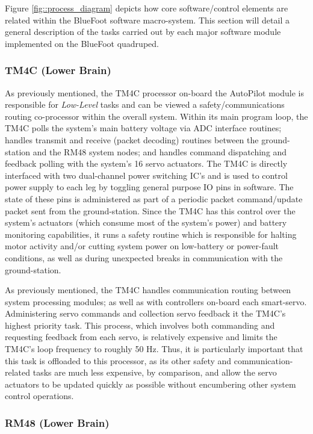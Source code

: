 		Figure \ref{fig::process_diagram} depicts how core software/control elements are related within the BlueFoot software macro-system. This section will detail a general description of the tasks carried out by each major software module implemented on the BlueFoot quadruped.

			\subsubsection{TM4C (Lower Brain)}

			As previously mentioned, the TM4C processor on-board the AutoPilot module is responsible for \emph{Low-Level} tasks and can be viewed a safety/communications routing co-processor within the overall system. Within its main program loop, the TM4C polls the system's main battery voltage via ADC interface routines; handles transmit and receive (packet decoding) routines between the ground-station and the RM48 system nodes; and handles command dispatching and feedback polling with the system's 16 servo actuators. The TM4C is directly interfaced with two dual-channel power switching IC's and is used to control power supply to each leg by toggling general purpose IO pins in software. The state of these pins is administered as part of a periodic packet command/update packet sent from the ground-station. Since the TM4C has this control over the system's actuators (which consume most of the system's power) and battery monitoring capabilities, it runs a safety routine which is responsible for halting motor activity and/or cutting system power on low-battery or power-fault conditions, as well as during unexpected breaks in communication with the ground-station.

			As previously mentioned, the TM4C handles communication routing between system processing modules; as well as with controllers on-board each smart-servo. Administering servo commands and collection servo feedback it the TM4C's highest priority task. This process, which involves both commanding and requesting feedback from each servo, is relatively expensive  and limits the TM4C's loop frequency to roughly 50 Hz. Thus, it is particularly important that this task is offloaded to this processor, as its other safety and communication-related tasks are much less expensive, by comparison, and allow the servo actuators to be updated quickly as possible without encumbering other system control operations.


			\subsubsection{RM48 (Lower Brain)}


